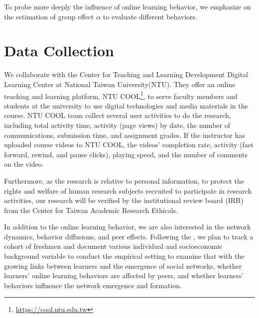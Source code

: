 \documentclass[a4paper]{article}
\theoremstyle{plain}
\begin{document}
To probe more deeply the influence of online learning behavior,
we emphasize on the estimation of group effect $\alpha$ to evaluate different
behaviors.



\section{Data Collection}
We collaborate with the
Center for Teaching and Learning Development Digital
Learning Center at National Taiwan University(NTU).
They offer an online teaching and learning platform,
NTU COOL\footnote{\url{https://cool.ntu.edu.tw}}, 
to serve faculty members and students at the university
to use digital technologies and media materials in the course.
NTU COOL team collect several user activities to do the research, including total activity time,
activity (page views) by date, the number of communications, 
submission time, and assignment grades. If the instructor has uploaded course
videos to NTU COOL, the videos' completion rate, activity
(fast forward, rewind, and pause clicks), playing speed, and the number of comments
on the video.

Furthermore,
as the research is relative to personal information,
to protect the rights and welfare of human research
subjects recruited to participate in research activities,
our research will be verified by the institutional review board (IRB) from
the Center for Taiwan Academic Research Ethicals.

In addition to the online learning behavior,
we are also interested in the network dynamics, behavior diffusions, and 
peer effects. Following the \cite{dynamic},
we plan to track a cohort of freshmen and 
document various individual and
socioeconomic background variable to 
conduct the empirical setting to examine that
with the growing links between learners and
the emergence of social networks, whether learners'
online learning behaviors are affected by peers,
and whether learners' behaviors influence the network
emergence and formation.



\end{document}
